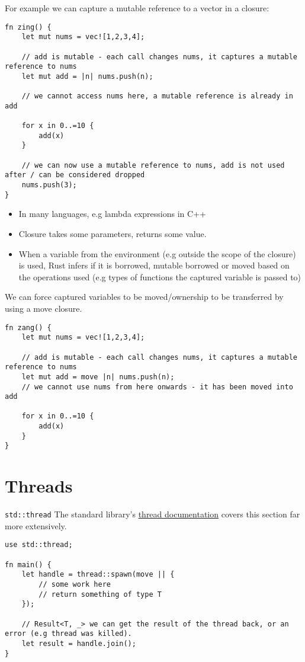 For example we can capture a mutable reference to a vector in a closure:
\begin{verbatim}
fn zing() {
    let mut nums = vec![1,2,3,4];

    // add is mutable - each call changes nums, it captures a mutable reference to nums
    let mut add = |n| nums.push(n);

    // we cannot access nums here, a mutable reference is already in add
    
    for x in 0..=10 {
        add(x)
    }
    
    // we can now use a mutable reference to nums, add is not used after / can be considered dropped
    nums.push(3);
}
\end{verbatim}

\begin{itemize}
	\item In many languages, e.g lambda expressions in C++
	\item Closure takes some parameters, returns some value.
	\item When a variable from the environment (e.g outside the scope of the closure) is used, Rust infers if it is borrowed, mutable borrowed or moved based on the operations used (e.g types of functions the captured variable is passed to)
\end{itemize}
We can force captured variables to be moved/ownership to be transferred by using a move closure.
\begin{verbatim}
fn zang() {
    let mut nums = vec![1,2,3,4];

    // add is mutable - each call changes nums, it captures a mutable reference to nums
    let mut add = move |n| nums.push(n);
    // we cannot use nums from here onwards - it has been moved into add
    
    for x in 0..=10 {
        add(x)
    }
}
\end{verbatim}

\section{Threads}
\begin{sidenotebox}{\texttt{std::thread}}
	The standard library's \href{https://doc.rust-lang.org/std/thread/}{thread documentation} covers this section far more extensively.
\end{sidenotebox}
\begin{verbatim}
use std::thread;

fn main() {
    let handle = thread::spawn(move || {
        // some work here
        // return something of type T
    });

    // Result<T, _> we can get the result of the thread back, or an error (e.g thread was killed).
    let result = handle.join();
}
\end{verbatim}

